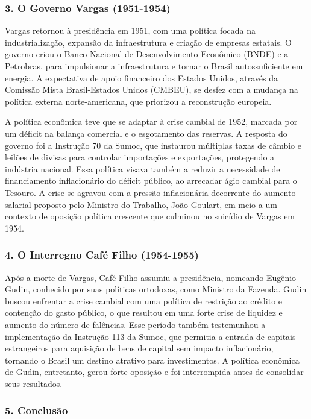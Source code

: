 \documentclass[a4paper,12pt]{article}[abntex2]
\begin{document}
\subsubsection{\textbf{3. O Governo Vargas (1951-1954)}}

Vargas retornou à presidência em 1951, com uma política focada na industrialização, expansão da infraestrutura e criação de empresas estatais. O governo criou o Banco Nacional de Desenvolvimento Econômico (BNDE) e a Petrobras, para impulsionar a infraestrutura e tornar o Brasil autossuficiente em energia. A expectativa de apoio financeiro dos Estados Unidos, através da Comissão Mista Brasil-Estados Unidos (CMBEU), se desfez com a mudança na política externa norte-americana, que priorizou a reconstrução europeia.

A política econômica teve que se adaptar à crise cambial de 1952, marcada por um déficit na balança comercial e o esgotamento das reservas. A resposta do governo foi a Instrução 70 da Sumoc, que instaurou múltiplas taxas de câmbio e leilões de divisas para controlar importações e exportações, protegendo a indústria nacional. Essa política visava também a reduzir a necessidade de financiamento inflacionário do déficit público, ao arrecadar ágio cambial para o Tesouro. A crise se agravou com a pressão inflacionária decorrente do aumento salarial proposto pelo Ministro do Trabalho, João Goulart, em meio a um contexto de oposição política crescente que culminou no suicídio de Vargas em 1954.

\subsubsection{\textbf{4. O Interregno Café Filho (1954-1955)}}

Após a morte de Vargas, Café Filho assumiu a presidência, nomeando Eugênio Gudin, conhecido por suas políticas ortodoxas, como Ministro da Fazenda. Gudin buscou enfrentar a crise cambial com uma política de restrição ao crédito e contenção do gasto público, o que resultou em uma forte crise de liquidez e aumento do número de falências. Esse período também testemunhou a implementação da Instrução 113 da Sumoc, que permitia a entrada de capitais estrangeiros para aquisição de bens de capital sem impacto inflacionário, tornando o Brasil um destino atrativo para investimentos. A política econômica de Gudin, entretanto, gerou forte oposição e foi interrompida antes de consolidar seus resultados.

\subsubsection{\textbf{5. Conclusão}}
\end{document}
